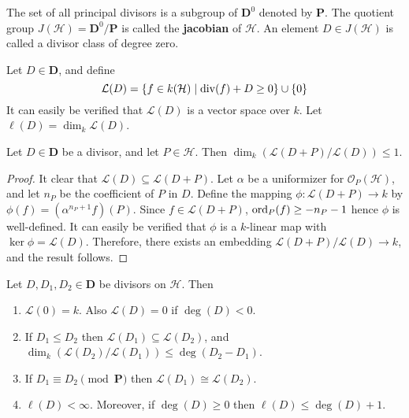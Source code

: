\begin{definition}
The set of all principal divisors is a subgroup of $\mathbf{D}^0$ denoted by $\mathbf{P}$. The 
quotient group $J(\mathcal{H}) = \mathbf{D}^0 / \mathbf{P}$ is called the \textbf{jacobian} of 
$\mathcal{H}$. An element $D \in J(\mathcal{H})$ is called a divisor class of degree zero.
\end{definition}
Let $D \in \mathbf{D}$, and define
$$
\mathcal{L}(D) = \{ f \in k(\mathcal{H}) \mid \operatorname{div}(f) + D \ge 0 \} \cup \{ 0 \}
$$
It can easily be verified that $\mathcal{L}(D)$ is a vector space over $k$. Let $\ell(D) = \dim_k 
\mathcal{L}(D)$.
\begin{lemma}
\label{lemma:L-point-add}
Let $D \in \mathbf{D}$ be a divisor, and let $P \in \mathcal{H}$. Then $\dim_k(\mathcal{L}(D + P) / 
\mathcal{L}(D)) \le 1$.
\end{lemma}
\begin{proof}
It clear that $\mathcal{L}(D) \subseteq \mathcal{L}(D + P)$. Let $\alpha$ be a uniformizer for 
$\mathcal{O}_P(\mathcal{H})$, and let $n_P$ be the coefficient of $P$ in $D$. Define the mapping 
$\phi: \mathcal{L}(D + P) \rightarrow k$ by $\phi(f) = (\alpha^{n_P + 1}f)(P)$. Since $f \in 
\mathcal{L}(D + P)$, $\operatorname{ord}_P(f) \ge -n_P - 1$ hence $\phi$ is well-defined. It can easily be 
verified that $\phi$ is a $k$-linear map with $\ker \phi = \mathcal{L}(D)$. Therefore, there exists 
an embedding $\mathcal{L}(D + P) / \mathcal{L}(D) \rightarrow k$, and the result follows.
\end{proof}
\begin{proposition}
\label{proposition:L-dim}
Let $D, D_1, D_2 \in \mathbf{D}$ be divisors on $\mathcal{H}$. Then
\begin{enumerate}
\item
\label{item:L-1}
$\mathcal{L}(0) = k$. Also $\mathcal{L}(D) = 0$ if $\deg(D) < 0$.
\item
\label{item:L-2}
If $D_1 \le D_2$ then $\mathcal{L}(D_1) \subseteq \mathcal{L}(D_2)$, and $\dim_k(\mathcal{L}(D_2) / 
\mathcal{L}(D_1)) \le \deg(D_2 - D_1)$.
\item
\label{item:L-3}
If $D_1 \equiv D_2 \pmod {\mathbf{P}}$ then $\mathcal{L}(D_1) \cong \mathcal{L}(D_2)$.
\item
\label{item:L-4}
$\ell(D) < \infty$. Moreover, if $\deg(D) \ge 0$ then $\ell(D) \le \deg(D) + 1$.
\end{enumerate}
\end{proposition}
